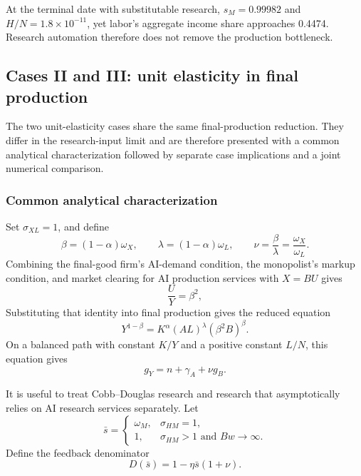 At the terminal date with substitutable research, \(s_M=0.99982\) and
\(H/N=1.8\times10^{-11}\), yet labor's aggregate income share approaches 0.4474.
Research automation therefore does not remove the production bottleneck.

\subsection{Cases II and III: unit elasticity in final production}

The two unit-elasticity cases share the same final-production reduction. They
differ in the research-input limit and are therefore presented with a common
analytical characterization followed by separate case implications and a joint
numerical comparison.

\subsubsection{Common analytical characterization}

Set \(\sigma_{XL}=1\), and define
\begin{equation}
 \beta=(1-\alpha)\omega_X,\qquad
 \lambda=(1-\alpha)\omega_L,\qquad
 \nu=\frac{\beta}{\lambda}=\frac{\omega_X}{\omega_L}.
 \label{eq:axm-cd-definitions}
\end{equation}
Combining the final-good firm's AI-demand condition, the monopolist's markup
condition, and market clearing for AI production services with \(X=BU\) gives
\begin{equation}
 \frac{U}{Y}=\beta^2,
 \label{eq:axm-inference-share-cd}
\end{equation}
Substituting that identity into final production gives the reduced equation
\begin{equation}
 Y^{1-\beta}
 =K^\alpha(AL)^\lambda(\beta^2B)^\beta.
 \label{eq:axm-reduced-cd}
\end{equation}
On a balanced path with constant \(K/Y\) and a positive constant \(L/N\), this
equation gives
\begin{equation}
 g_Y=n+\gamma_A+\nu g_B.
 \label{eq:axm-output-growth-cd}
\end{equation}

It is useful to treat Cobb--Douglas research and research that asymptotically relies on AI research services
separately. Let
\begin{equation}
 \bar s=
 \begin{cases}
  \omega_M,&\sigma_{HM}=1,\\
  1,&\sigma_{HM}>1\text{ and }Bw\to\infty.
 \end{cases}
 \label{eq:axm-sbar}
\end{equation}
Define the feedback denominator
\begin{equation}
 D(\bar s)=1-\eta\bar s(1+\nu).
 \label{eq:axm-feedback-denominator}
\end{equation}

